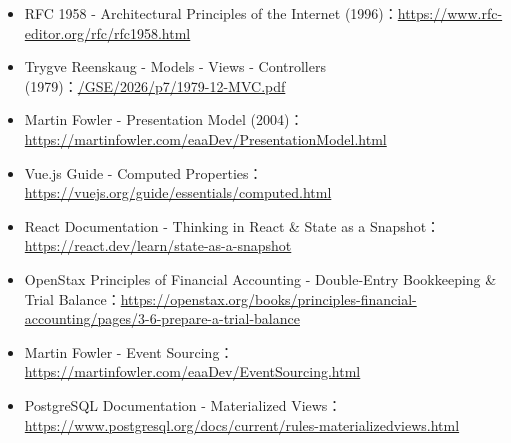 \documentclass[UTF8,a4paper,11pt,fontset=fandol]{ctexart}
\begin{document}
\begin{itemize}
\item RFC 1958 - Architectural Principles of the Internet (1996)：\url{https://www.rfc-editor.org/rfc/rfc1958.html}

\item Trygve Reenskaug - Models - Views - Controllers (1979)：\url{/GSE/2026/p7/1979-12-MVC.pdf}

\item Martin Fowler - Presentation Model (2004)：\url{https://martinfowler.com/eaaDev/PresentationModel.html}

\item Vue.js Guide - Computed Properties：\url{https://vuejs.org/guide/essentials/computed.html}

\item React Documentation - Thinking in React \& State as a Snapshot：\url{https://react.dev/learn/state-as-a-snapshot}

\item OpenStax Principles of Financial Accounting - Double-Entry Bookkeeping \& Trial Balance：\url{https://openstax.org/books/principles-financial-accounting/pages/3-6-prepare-a-trial-balance}

\item Martin Fowler - Event Sourcing：\url{https://martinfowler.com/eaaDev/EventSourcing.html}

\item PostgreSQL Documentation - Materialized Views：\url{https://www.postgresql.org/docs/current/rules-materializedviews.html}

\end{itemize}
\end{document}
